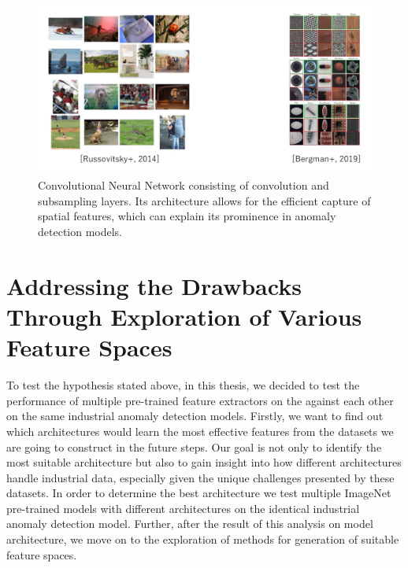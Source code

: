 \begin{figure}[t]
	\begin{center}
		\includegraphics[width=1.0\linewidth]{Chapter_3/discrepancy.png}
	\end{center}
	\caption{Convolutional Neural Network consisting of convolution and subsampling layers. Its architecture allows for the efficient capture of spatial features, which can explain its prominence in anomaly detection models.}
	\label{fig:cnn}
\end{figure} 	

\section{Addressing the Drawbacks Through Exploration of Various Feature Spaces}
\label{addressing the drawbacks}
To test the hypothesis stated above, in this thesis, we decided to test the performance of multiple pre-trained feature extractors on the against each other on the same industrial anomaly detection models. Firstly, we want to find out which architectures would learn the most effective features from the datasets we are going to construct in the future steps. Our goal is not only to identify the most suitable architecture but also to gain insight into how different architectures handle industrial data, especially given the unique challenges presented by these datasets. In order to determine the best architecture we test multiple ImageNet pre-trained models with different architectures on the identical industrial anomaly detection model. Further, after the result of this analysis on model architecture, we move on to the exploration of methods for generation of suitable feature spaces.

